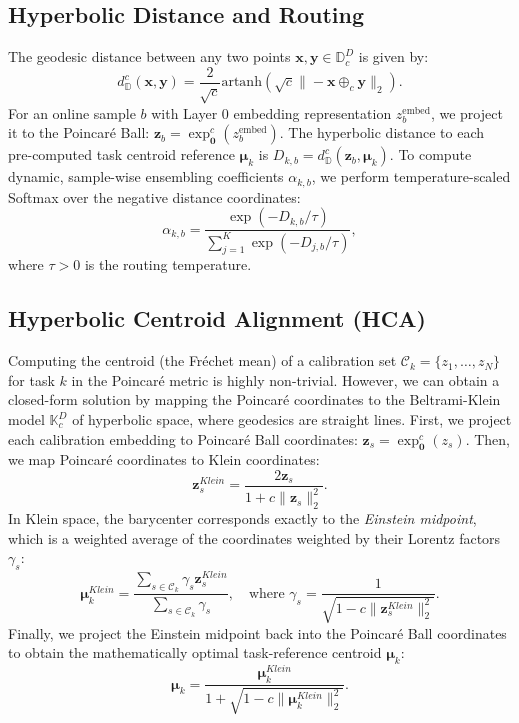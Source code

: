 \subsection{Hyperbolic Distance and Routing}
The geodesic distance between any two points $\mathbf{x}, \mathbf{y} \in \mathbb{D}_c^D$ is given by:
\begin{equation}
d_{\mathbb{D}}^c(\mathbf{x}, \mathbf{y}) = \frac{2}{\sqrt{c}} \text{artanh}\left( \sqrt{c} \|\!-\mathbf{x} \oplus_c \mathbf{y}\|_2 \right).
\end{equation}
For an online sample $b$ with Layer 0 embedding representation $z_b^{\text{embed}}$, we project it to the Poincaré Ball: $\mathbf{z}_b = \exp_{\mathbf{0}}^c(z_b^{\text{embed}})$. The hyperbolic distance to each pre-computed task centroid reference $\boldsymbol{\mu}_k$ is $D_{k, b} = d_{\mathbb{D}}^c(\mathbf{z}_b, \boldsymbol{\mu}_k)$. To compute dynamic, sample-wise ensembling coefficients $\alpha_{k, b}$, we perform temperature-scaled Softmax over the negative distance coordinates:
\begin{equation}
\alpha_{k, b} = \frac{\exp(-D_{k, b} / \tau)}{\sum_{j=1}^K \exp(-D_{j, b} / \tau)},
\label{eq:routing}
\end{equation}
where $\tau > 0$ is the routing temperature.

\subsection{Hyperbolic Centroid Alignment (HCA)}
Computing the centroid (the Fréchet mean) of a calibration set $\mathcal{C}_k = \{z_{1}, \dots, z_{N}\}$ for task $k$ in the Poincaré metric is highly non-trivial. However, we can obtain a closed-form solution by mapping the Poincaré coordinates to the Beltrami-Klein model $\mathbb{K}_c^D$ of hyperbolic space, where geodesics are straight lines.
First, we project each calibration embedding to Poincaré Ball coordinates: $\mathbf{z}_s = \exp_{\mathbf{0}}^c(z_s)$. Then, we map Poincaré coordinates to Klein coordinates:
\begin{equation}
\mathbf{z}_s^{Klein} = \frac{2 \mathbf{z}_s}{1 + c \|\mathbf{z}_s\|_2^2}.
\end{equation}
In Klein space, the barycenter corresponds exactly to the \emph{Einstein midpoint}, which is a weighted average of the coordinates weighted by their Lorentz factors $\gamma_s$:
\begin{equation}
\boldsymbol{\mu}_k^{Klein} = \frac{\sum_{s \in \mathcal{C}_k} \gamma_s \mathbf{z}_s^{Klein}}{\sum_{s \in \mathcal{C}_k} \gamma_s}, \quad \text{where } \gamma_s = \frac{1}{\sqrt{1 - c \|\mathbf{z}_s^{Klein}\|_2^2}}.
\end{equation}
Finally, we project the Einstein midpoint back into the Poincaré Ball coordinates to obtain the mathematically optimal task-reference centroid $\boldsymbol{\mu}_k$:
\begin{equation}
\boldsymbol{\mu}_k = \frac{\boldsymbol{\mu}_k^{Klein}}{1 + \sqrt{1 - c \|\boldsymbol{\mu}_k^{Klein}\|_2^2}}.
\end{equation}

